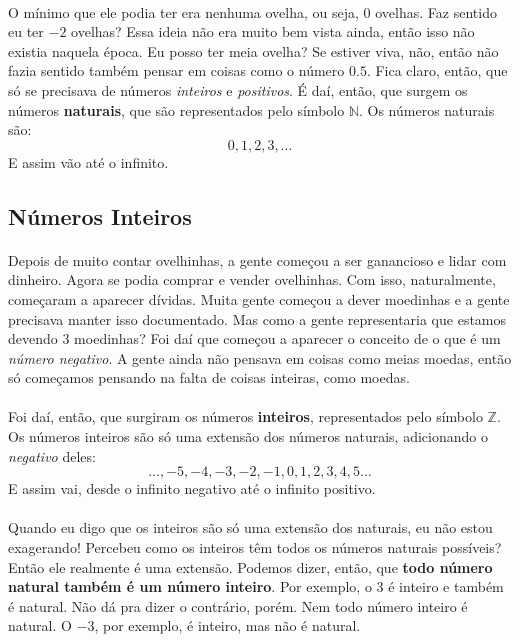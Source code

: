 \documentclass[11pt]{article}
\begin{document}
\paragraph{}
O mínimo que ele podia ter era nenhuma ovelha, ou seja, 0 ovelhas. Faz sentido
eu ter $-2$ ovelhas? Essa ideia não era muito bem vista ainda, então isso não
existia naquela época. Eu posso ter meia ovelha? Se estiver viva, não, então
não fazia sentido também pensar em coisas como o número $0.5$. Fica claro, 
então, que só se precisava de números \emph{inteiros} e \emph{positivos}.
É daí, então, que surgem os números \textbf{naturais}, que são representados
pelo símbolo $\mathbb{N}$. Os números naturais são:
$$0, 1, 2, 3, \dots$$
E assim vão até o infinito.

\subsection{Números Inteiros}
\paragraph{}
Depois de muito contar ovelhinhas, a gente começou a ser ganancioso e lidar com
dinheiro. Agora se podia comprar e vender ovelhinhas. Com isso, naturalmente,
começaram a aparecer dívidas. Muita gente começou a dever moedinhas e a gente
precisava manter isso documentado. Mas como a gente representaria que estamos
devendo 3 moedinhas? Foi daí que começou a aparecer o conceito de o que é um
\emph{número negativo}. A gente ainda não pensava em coisas como meias moedas,
então só começamos pensando na falta de coisas inteiras, como moedas.
\paragraph{}
Foi daí, então, que surgiram os números \textbf{inteiros}, representados pelo
símbolo $\mathbb{Z}$. Os números inteiros são só uma extensão dos números 
naturais, adicionando o \emph{negativo} deles:
$$\dots, -5, -4, -3, -2, -1, 0, 1, 2, 3, 4, 5 \dots$$
E assim vai, desde o infinito negativo até o infinito positivo.
\paragraph{}
Quando eu digo que os inteiros são só uma extensão dos naturais, eu não estou
exagerando! Percebeu como os inteiros têm todos os números naturais possíveis?
Então ele realmente é uma extensão. Podemos dizer, então, que \textbf{todo
número natural também é um número inteiro}. Por exemplo, o 3 é inteiro e também
é natural. Não dá pra dizer o contrário, porém. Nem todo número inteiro é 
natural. O $-3$, por exemplo, é inteiro, mas não é natural. 
\end{document}
